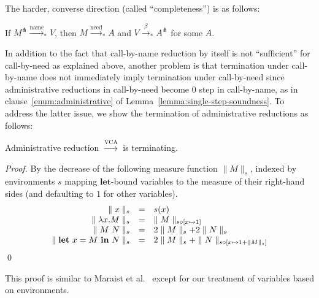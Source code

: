 \documentclass[english]{sumiilab-paper}
\newcommand{\LET}[3]{\mathbf{let}~#1=#2~\mathbf{in}~#3}
\newcommand{\EXPANDLET}[1]{#1^\pitchfork}
\newcommand{\SIZE}[2]{\parallel #1 \parallel_{#2}}
\newcommand{\FULLBETA}{\xrightarrow{\beta}}
\newcommand{\CALLBYNAME}{\xrightarrow{\mathrm{name}}}
\newcommand{\CALLBYNEED}{\xrightarrow{\mathrm{need}}}
\newcommand{\CALLBYNEEDVCA}{\xrightarrow{\mathrm{VCA}}}
\newcommand{\RTCLOS}[1]{#1_*}
\newcommand{\lemmaname}{Lemma}
\begin{document}
The harder, converse direction (called ``completeness'') is as follows:
%
\begin{theorem}[completeness]\label{theorem:completeness}
	If $\EXPANDLET{M} \RTCLOS{\CALLBYNAME} V$, then $M \RTCLOS{\CALLBYNEED} A$ and $V \RTCLOS{\FULLBETA} \EXPANDLET{A}$ for some $A$.
\end{theorem}

In addition to the fact that call-by-name reduction by itself is not ``sufficient'' for call-by-need as explained above, another problem is that termination under call-by-name does not immediately imply termination under call-by-need since administrative reductions in call-by-need become 0 step in call-by-name, as in clause~\ref{enum:administrative} of \lemmaname~\ref{lemma:single-step-soundness}.
To address the latter issue, we show the termination of administrative reductions as follows:
%
\begin{lemma}\label{lemma:VCA-terminates}
	Administrative reduction $\CALLBYNEEDVCA$ is terminating.
\end{lemma}
%
\begin{proof}
	By the decrease of the following measure function $\SIZE{M}{s}$, indexed by environments $s$ mapping $\mathbf{let}$-bound variables to the measure of their right-hand sides (and defaulting to $1$ for other variables).
	\[ \begin{array}{rcl}
		\SIZE{x}{s} & = & s(x) \\
		\SIZE{\lambda x. M}{s} & = & \SIZE{M}{s \circ [x \mapsto 1]} \\
		\SIZE{M~N}{s} & = & 2\SIZE{M}{s}+2\SIZE{N}{s} \\
		\SIZE{\LET{x}{M}{N}}{s} & = & 2\SIZE{M}{s}+\SIZE{N}{s \circ [x \mapsto 1+\SIZE{M}{s}]}
	\end{array}\vspace{-\baselineskip} \]\qed %
\end{proof}
%
This proof is similar to Maraist et al.~\cite[p. 287]{Maraist98} except for our treatment of variables based on environments.
\end{document}
